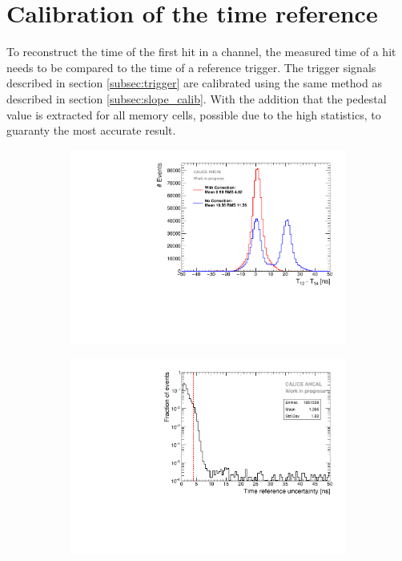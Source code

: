 \section{Calibration of the time reference}
\label{section:time_ref}

To reconstruct the time of the first hit in a channel, the measured time of a hit needs to be compared to the time of a reference trigger. The trigger signals described in section \ref{subsec:trigger} are calibrated using the same method as described in section \ref{subsec:slope_calib}. With the addition that the pedestal value is extracted for all memory cells, possible due to the high statistics, to guaranty the most accurate result.

\begin{figure}[htbp!]
	\begin{subfigure}[t]{0.5\textwidth}
		\centering
		\includegraphics[width=1\textwidth]{../Thesis_Plots/Timing/T0s/Plots/T0_Resolution_5.pdf}
		\caption{}	\label{fig:T0_Correction}
	\end{subfigure}
	\hfill
	\begin{subfigure}[t]{0.5\textwidth}
		\centering
		\includegraphics[width=1\linewidth]{../Thesis_Plots/Timing/T0s/Plots/T0ReferenceError}

\end{subfigure}
\end{figure}
